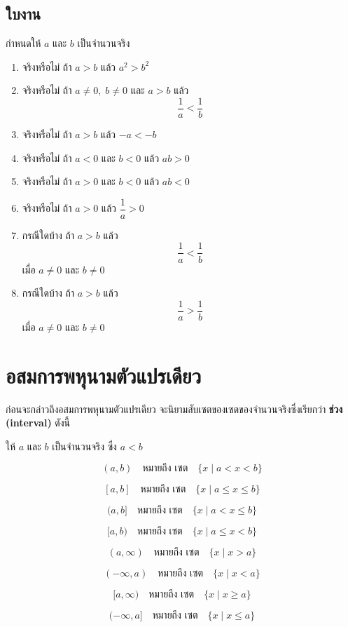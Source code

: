 \newpage
\subsection*{ใบงาน}

กำหนดให้ $a$ และ $b$ เป็นจำนวนจริง
\begin{enumerate}[label=\arabic*., leftmargin=2em, itemsep=0.6em]
	\item จริงหรือไม่ ถ้า $a > b$ แล้ว $a^2 > b^2$
	
	\item จริงหรือไม่ ถ้า $a \neq 0, \; b \neq 0$ และ $a > b$ แล้ว 
	$$\dfrac{1}{a} < \dfrac{1}{b}$$
	
	\item จริงหรือไม่ ถ้า $a > b$ แล้ว $-a < -b$
	
	\item จริงหรือไม่ ถ้า $a < 0$ และ $b < 0$ แล้ว $ab > 0$
	
	\item จริงหรือไม่ ถ้า $a > 0$ และ $b < 0$ แล้ว $ab < 0$
	
	\item จริงหรือไม่ ถ้า $a > 0$ แล้ว $\dfrac{1}{a} > 0$
	
	\item กรณีใดบ้าง ถ้า $a > b$ แล้ว 
	$$\dfrac{1}{a} < \dfrac{1}{b}$$ 
	เมื่อ $a \neq 0$ และ $b \neq 0$
	
	\item กรณีใดบ้าง ถ้า $a > b$ แล้ว 
	$$\dfrac{1}{a} > \dfrac{1}{b}$$ 
	เมื่อ $a \neq 0$ และ $b \neq 0$
\end{enumerate}

\newpage
\section{อสมการพหุนามตัวแปรเดียว}

ก่อนจะกล่าวถึงอสมการพหุนามตัวแปรเดียว จะนิยามสับเซตของเซตของจำนวนจริงซึ่งเรียกว่า \textbf{ช่วง (interval)} ดังนี้

\begin{definitionbox}
	ให้ $a$ และ $b$ เป็นจำนวนจริง ซึ่ง $a < b$
	
	\[
	(a,b) \quad \text{หมายถึง เซต} \quad \{x \mid a < x < b\}
	\]
	
	\[
	[a,b] \quad \text{หมายถึง เซต} \quad \{x \mid a \leq x \leq b\}
	\]
	
	\[
	(a,b] \quad \text{หมายถึง เซต} \quad \{x \mid a < x \leq b\}
	\]
	
	\[
	[a,b) \quad \text{หมายถึง เซต} \quad \{x \mid a \leq x < b\}
	\]
	
	\[
	(a,\infty) \quad \text{หมายถึง เซต} \quad \{x \mid x > a\}
	\]
	
	\[
	(-\infty,a) \quad \text{หมายถึง เซต} \quad \{x \mid x < a\}
	\]
	
	\[
	[a,\infty) \quad \text{หมายถึง เซต} \quad \{x \mid x \geq a\}
	\]
	
	\[
	(-\infty,a] \quad \text{หมายถึง เซต} \quad \{x \mid x \leq a\}
	\]
\end{definitionbox}

